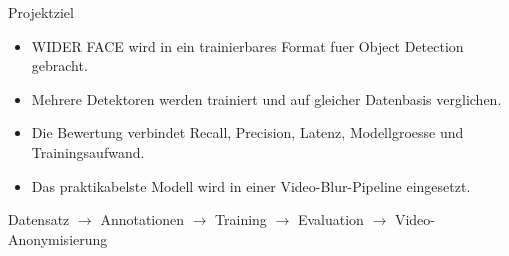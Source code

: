 \begin{frame}{Projektziel}
\begin{itemize}
    \item WIDER FACE wird in ein trainierbares Format fuer Object Detection gebracht.
    \item Mehrere Detektoren werden trainiert und auf gleicher Datenbasis verglichen.
    \item Die Bewertung verbindet Recall, Precision, Latenz, Modellgroesse und Trainingsaufwand.
    \item Das praktikabelste Modell wird in einer Video-Blur-Pipeline eingesetzt.
\end{itemize}
\vspace{0.4em}
\begin{mynote}[Pipeline]
Datensatz $\rightarrow$ Annotationen $\rightarrow$ Training $\rightarrow$ Evaluation $\rightarrow$ Video-Anonymisierung
\end{mynote}
\end{frame}
